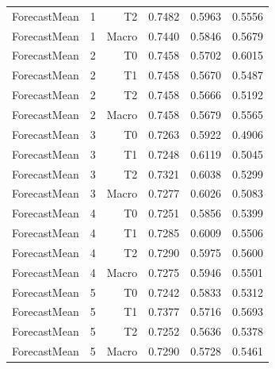 \begin{table}[t]
\begin{tabular}{llrrrr}
ForecastMean & 1 & T2 & 0.7482 & 0.5963 & 0.5556 \\
ForecastMean & 1 & Macro & 0.7440 & 0.5846 & 0.5679 \\
ForecastMean & 2 & T0 & 0.7458 & 0.5702 & 0.6015 \\
ForecastMean & 2 & T1 & 0.7458 & 0.5670 & 0.5487 \\
ForecastMean & 2 & T2 & 0.7458 & 0.5666 & 0.5192 \\
ForecastMean & 2 & Macro & 0.7458 & 0.5679 & 0.5565 \\
ForecastMean & 3 & T0 & 0.7263 & 0.5922 & 0.4906 \\
ForecastMean & 3 & T1 & 0.7248 & 0.6119 & 0.5045 \\
ForecastMean & 3 & T2 & 0.7321 & 0.6038 & 0.5299 \\
ForecastMean & 3 & Macro & 0.7277 & 0.6026 & 0.5083 \\
ForecastMean & 4 & T0 & 0.7251 & 0.5856 & 0.5399 \\
ForecastMean & 4 & T1 & 0.7285 & 0.6009 & 0.5506 \\
ForecastMean & 4 & T2 & 0.7290 & 0.5975 & 0.5600 \\
ForecastMean & 4 & Macro & 0.7275 & 0.5946 & 0.5501 \\
ForecastMean & 5 & T0 & 0.7242 & 0.5833 & 0.5312 \\
ForecastMean & 5 & T1 & 0.7377 & 0.5716 & 0.5693 \\
ForecastMean & 5 & T2 & 0.7252 & 0.5636 & 0.5378 \\
ForecastMean & 5 & Macro & 0.7290 & 0.5728 & 0.5461 \\
\bottomrule
\end{tabular}
\end{table}

